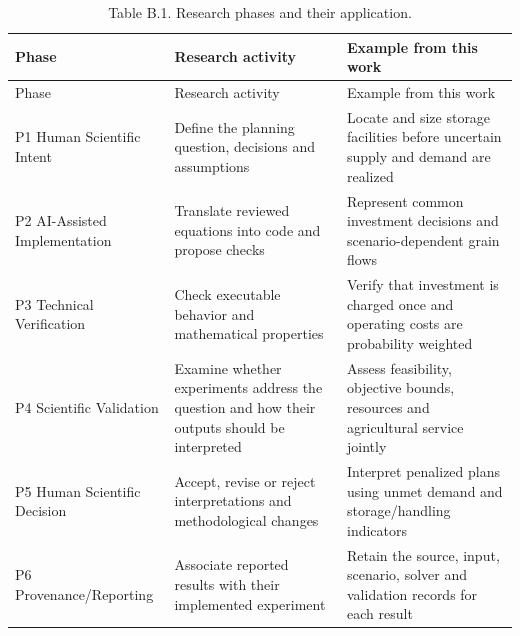 \documentclass[
  english,
  11pt,
  a4paper,
]{article}
\begin{document}
\begin{longtable}[]{@{}
  >{\raggedright\arraybackslash}p{}
  >{\raggedright\arraybackslash}p{}
  >{\raggedright\arraybackslash}p{}@{}}
\caption{Table B.1. Research phases and their
application.}\tabularnewline
\toprule\noalign{}
\begin{minipage}[b]{\linewidth}\raggedright
Phase
\end{minipage} & \begin{minipage}[b]{\linewidth}\raggedright
Research activity
\end{minipage} & \begin{minipage}[b]{\linewidth}\raggedright
Example from this work
\end{minipage} \\
\midrule\noalign{}
\endfirsthead
\toprule\noalign{}
\begin{minipage}[b]{\linewidth}\raggedright
Phase
\end{minipage} & \begin{minipage}[b]{\linewidth}\raggedright
Research activity
\end{minipage} & \begin{minipage}[b]{\linewidth}\raggedright
Example from this work
\end{minipage} \\
\midrule\noalign{}
\endhead
\bottomrule\noalign{}
\endlastfoot
P1 Human Scientific Intent & Define the planning question, decisions and
assumptions & Locate and size storage facilities before uncertain supply
and demand are realized \\
P2 AI-Assisted Implementation & Translate reviewed equations into code
and propose checks & Represent common investment decisions and
scenario-dependent grain flows \\
P3 Technical Verification & Check executable behavior and mathematical
properties & Verify that investment is charged once and operating costs
are probability weighted \\
P4 Scientific Validation & Examine whether experiments address the
question and how their outputs should be interpreted & Assess
feasibility, objective bounds, resources and agricultural service
jointly \\
P5 Human Scientific Decision & Accept, revise or reject interpretations
and methodological changes & Interpret penalized plans using unmet
demand and storage/handling indicators \\
P6 Provenance/Reporting & Associate reported results with their
implemented experiment & Retain the source, input, scenario, solver and
validation records for each result \\
\end{longtable}
\end{document}
